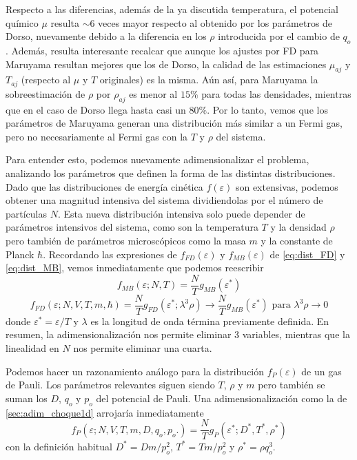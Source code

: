 Respecto a las diferencias, además de la ya discutida temperatura, el potencial químico $\mu$ resulta $\sim 6$ veces mayor respecto al obtenido por los parámetros de Dorso, nuevamente
debido a la diferencia en los $\rho$ introducida por el cambio de $q_o$.
Además, resulta interesante recalcar que aunque los ajustes por FD para Maruyama resultan mejores que los de Dorso, la calidad de las estimaciones $\mu_{aj}$ y $T_{aj}$ 
(respecto al $\mu$ y $T$ originales) es la misma.
Aún así, para Maruyama la sobreestimación de $\rho$ por $\rho_{aj}$ es menor al $15\%$ para todas las densidades, mientras que en el caso de Dorso llega hasta casi un $80\%$.
Por lo tanto, vemos que los parámetros de Maruyama generan una distribución más similar a un Fermi gas, pero no necesariamente al Fermi gas con la $T$ y $\rho$ del sistema.


Para entender esto, podemos nuevamente adimensionalizar el problema, analizando los parámetros que definen la forma de las distintas distribuciones.
Dado que las distribuciones de energía cinética $f(\varepsilon)$ son extensivas, podemos obtener una magnitud intensiva del sistema dividiendolas por el número de partículas $N$.
Esta nueva distribución intensiva solo puede depender de parámetros intensivos del sistema, como son la temperatura $T$ y la densidad $\rho$ pero también de parámetros microscópicos como
la masa $m$ y la constante de Planck $\hbar$.
Recordando las expresiones de $f_{FD}(\varepsilon)$ y $f_{MB}(\varepsilon)$ de \eqref{eq:dist_FD} y \eqref{eq:dist_MB}, vemos inmediatamente que podemos reescribir
\[ f_{MB}(\varepsilon;N,T) = \frac{N}{T}g_{MB}(\varepsilon^*) \]
\[ f_{FD}(\varepsilon;N, V, T, m, \hbar) = \frac{N}{T}g_{FD}(\varepsilon^*;\lambda^3\rho) \to \frac{N}{T}g_{MB}(\varepsilon^*) \text{ para } \lambda^3\rho\to0 \]
donde $\varepsilon^* = \varepsilon/T$ y $\lambda$ es la longitud de onda términa previamente definida.
En resumen, la adimensionalización nos permite eliminar 3 variables, mientras que la linealidad en $N$ nos permite eliminar una cuarta.

Podemos hacer un razonamiento análogo para la distribución $f_P(\varepsilon)$ de un gas de Pauli.
Los parámetros relevantes siguen siendo $T$, $\rho$ y $m$ pero también se suman los $D$, $q_o$ y $p_o$ del potencial de Pauli.
Una adimensionalización como la de \ref{sec:adim_choque1d} arrojaría inmediatamente
\[ f_P(\varepsilon; N,V,T, m, D, q_o,p_o.) = \frac{N}{T}g_P(\varepsilon^*; D^*, T^*, \rho^*)\]
con la definición habitual $D^*=Dm/p_o^2$, $T^*=Tm/p_o^2$ y $\rho^* = \rho q_o^3$.

